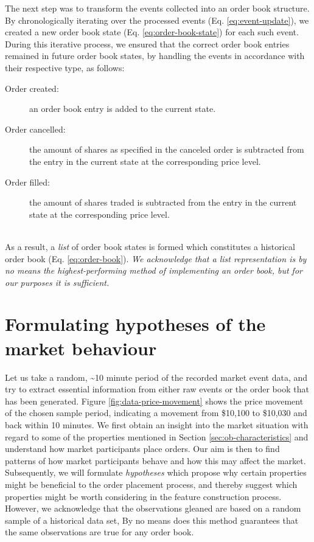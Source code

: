 The next step was to transform the events collected into an order book structure.
By chronologically iterating over the processed events (Eq. \ref{eq:event-update}), we created a new order book state (Eq. \ref{eq:order-book-state}) for each such event.
During this iterative process, we ensured that the correct order book entries remained in future order book states, by handling the events in accordance with their respective type, as follows:
\begin{description}
    \item[Order created:] an order book entry is added to the current state.
    \item[Order cancelled:] the amount of shares as specified in the canceled order is subtracted from the entry in the current state at the corresponding price level.
    \item[Order filled:] the amount of shares traded is subtracted from the entry in the current state at the corresponding price level.
\end{description}
\hfill
\\
As a result, a \textit{list} of order book states is formed which constitutes a historical order book (Eq. \ref{eq:order-book}).
\textit{We acknowledge that a list representation is by no means the highest-performing method of implementing an order book, but for our purposes it is sufficient.}

\vfill

\section{Formulating hypotheses of the market behaviour}
\label{sec:data-hypotheses}

Let us  take a random, \textasciitilde10 minute period of the recorded market event data, and try to extract essential information from either raw events or the order book that has been generated.
Figure \ref{fig:data-price-movement} shows the price movement of the chosen sample period, indicating a movement from \$10,100 to \$10,030 and back within 10 minutes.
We first obtain an insight into the market situation with regard to some of the properties mentioned in Section \ref{sec:ob-characteristics} and understand how market participants place orders.
Our aim is then to find patterns of how market participants behave and how this may affect the market.
Subsequently, we will formulate \textit{hypotheses} which propose why certain properties might be beneficial to the order placement process, and thereby suggest which properties might be worth considering in the feature construction process. 
However, we acknowledge that the observations gleaned are based on a random sample of a historical data set,
By no means does this method guarantees that the same observations are true for any order book.

